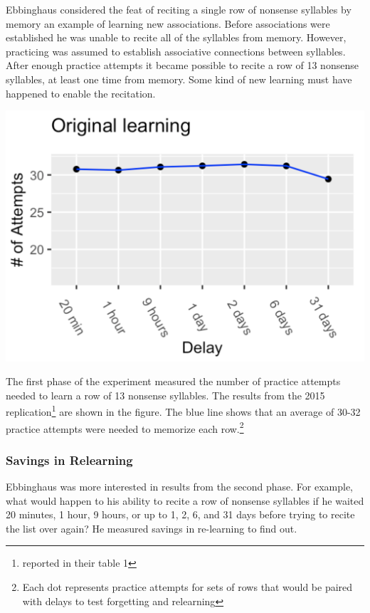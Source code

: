 \documentclass[
  oneside,
  12pt]{crumpbook}
\newenvironment{floatright50}{%
  \wrapfigure{R}{.5\textwidth}%
  }{%
  \endwrapfigure}
\begin{document}
Ebbinghaus considered the feat of reciting a single row of nonsense syllables by memory an example of learning new associations. Before associations were established he was unable to recite all of the syllables from memory. However, practicing was assumed to establish associative connections between syllables. After enough practice attempts it became possible to recite a row of 13 nonsense syllables, at least one time from memory. Some kind of new learning must have happened to enable the recitation.

\begin{floatright50}
\includegraphics[width=1\linewidth]{imgs/Ebbinghaus_OL}

\end{floatright50}

The first phase of the experiment measured the number of practice attempts needed to learn a row of 13 nonsense syllables. The results from the 2015 replication\footnote{reported in their table 1} are shown in the figure. The blue line shows that an average of 30-32 practice attempts were needed to memorize each row.\footnote{Each dot represents practice attempts for sets of rows that would be paired with delays to test forgetting and relearning}

\hypertarget{savings-in-relearning}{%
\subsubsection{Savings in Relearning}\label{savings-in-relearning}}

Ebbinghaus was more interested in results from the second phase. For example, what would happen to his ability to recite a row of nonsense syllables if he waited 20 minutes, 1 hour, 9 hours, or up to 1, 2, 6, and 31 days before trying to recite the list over again? He measured savings in re-learning to find out.
\end{document}
